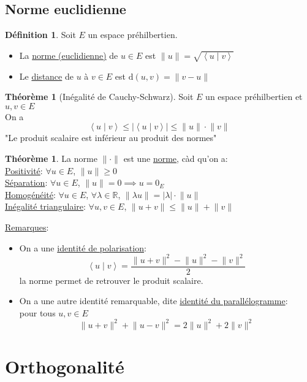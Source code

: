 \documentclass[10pt,a4paper]{article}
\theoremstyle{definition}
\newtheorem{theorem}[proposition]{Théorème}
\newtheorem{definition}[proposition]{Définition}
\newcommand{\vp}[2]{\left< #1 \mid #2 \right>}
\begin{document}
\subsection{Norme euclidienne}
\begin{definition}
Soit $E$ un espace préhilbertien.
\begin{itemize}
\item La \uline{norme (euclidienne)} de $u \in E$ est $\lVert u \rVert = \sqrt{\vp{u}{v}}$
\item Le \uline{distance} de $u$ à $v \in E$ est $\text{d}(u, v) = \lVert v - u \rVert$
\end{itemize}
\end{definition}
\begin{theorem}[Inégalité de Cauchy-Schwarz]
Soit $E$ un espace préhilbertien et $u, v \in E$ \\
On a
\[ \vp{u}{v} \leq \left| \vp{u}{v} \right| \leq \lVert u \rVert \cdot \lVert v \rVert \]
"Le produit scalaire est inférieur au produit des normes"
\end{theorem}
\begin{theorem}
La norme $\lVert \cdot \rVert$ est une \uline{norme}, càd qu'on a: \\
\uline{Positivité}: $\forall u \in E$, $\lVert u \rVert \geq 0$ \\
\uline{Séparation}: $\forall u \in E$, $\lVert u \rVert = 0 \implies u = 0_E$ \\
\uline{Homogénéité}: $\forall u \in E$, $\forall \lambda \in \mathbb{R}$, $\lVert \lambda u \rVert = |\lambda| \cdot \lVert u \rVert$ \\
\uline{Inégalité triangulaire}: $\forall u, v \in E$, $\lVert u + v \rVert \leq \lVert u \rVert + \lVert v \rVert$
\end{theorem}
\noindent \uline{Remarques}:
\begin{itemize}
\item On a une \uline{identité de polarisation}:
\[ \vp{u}{v} = \frac{\lVert u + v \rVert^2 - \lVert u \rVert^2 - \lVert v \rVert^2}{2} \]
la norme permet de retrouver le produit scalaire.
\item On a une autre identité remarquable, dite \uline{identité du parallélogramme}: \\
pour tous $u, v \in E$
\[ \lVert u + v \rVert^2 + \lVert u - v \rVert^2 = 2 \lVert u \rVert^2 + 2 \lVert v \rVert^2 \]
\end{itemize}

\section{Orthogonalité}
\end{document}
